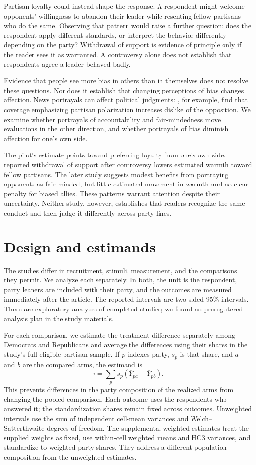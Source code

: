 \documentclass[11pt]{article}
\begin{document}
Partisan loyalty could instead shape the response. A respondent might welcome opponents' willingness to abandon their leader while resenting fellow partisans who do the same. Observing that pattern would raise a further question: does the respondent apply different standards, or interpret the behavior differently depending on the party? Withdrawal of support is evidence of principle only if the reader sees it as warranted. A controversy alone does not establish that respondents agree a leader behaved badly.

Evidence that people see more bias in others than in themselves \citep{pronin2002} does not resolve these questions. Nor does it establish that changing perceptions of bias changes affection. News portrayals can affect political judgments: \citet{levendusky2016}, for example, find that coverage emphasizing partisan polarization increases dislike of the opposition. We examine whether portrayals of accountability and fair-mindedness move evaluations in the other direction, and whether portrayals of bias diminish affection for one's own side.

The pilot's estimate points toward preferring loyalty from one's own side: reported withdrawal of support after controversy lowers estimated warmth toward fellow partisans. The later study suggests modest benefits from portraying opponents as fair-minded, but little estimated movement in warmth and no clear penalty for biased allies. These patterns warrant attention despite their uncertainty. Neither study, however, establishes that readers recognize the same conduct and then judge it differently across party lines.

\section{Design and estimands}
The studies differ in recruitment, stimuli, measurement, and the comparisons they permit. We analyze each separately. In both, the unit is the respondent, party leaners are included with their party, and the outcomes are measured immediately after the article. The reported intervals are two-sided 95\% intervals. These are exploratory analyses of completed studies; we found no preregistered analysis plan in the study materials.

For each comparison, we estimate the treatment difference separately among Democrats and Republicans and average the differences using their shares in the study's full eligible partisan sample. If $p$ indexes party, $s_p$ is that share, and $a$ and $b$ are the compared arms, the estimand is
\[
\widehat\tau=\sum_p s_p(\overline Y_{pa}-\overline Y_{pb}).
\]
This prevents differences in the party composition of the realized arms from changing the pooled comparison. Each outcome uses the respondents who answered it; the standardization shares remain fixed across outcomes. Unweighted intervals use the sum of independent cell-mean variances and Welch--Satterthwaite degrees of freedom. The supplemental weighted estimates treat the supplied weights as fixed, use within-cell weighted means and HC3 variances, and standardize to weighted party shares. They address a different population composition from the unweighted estimates.
\end{document}
